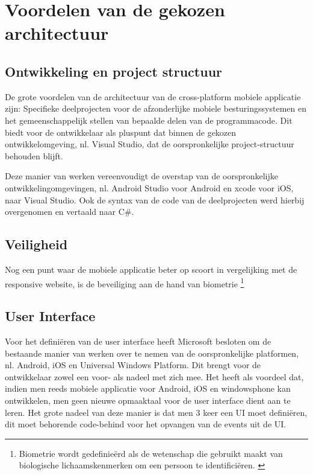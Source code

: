 \label{sec:voordelenvandegekozenapparchitectuur}
\section{Voordelen van de gekozen architectuur}
\subsection{Ontwikkeling en project structuur}
De grote voordelen van de architectuur van de cross-platform mobiele applicatie zijn: Specifieke deelprojecten voor de afzonderlijke
mobiele besturingssystemen en het gemeenschappelijk stellen van bepaalde delen van de programmacode. Dit biedt voor de ontwikkelaar
als pluspunt dat binnen de gekozen ontwikkelomgeving, nl. Visual Studio, dat de oorspronkelijke project-structuur behouden blijft.

Deze manier van werken vereenvoudigt de overstap van de oorspronkelijke ontwikkelingomgevingen, nl. Android Studio voor Android en xcode voor iOS, naar Visual Studio.
Ook de syntax van de code van de deelprojecten werd hierbij overgenomen en vertaald naar C\#.

\subsection{Veiligheid}
Nog een punt waar de mobiele applicatie beter op scoort in vergelijking met de responsive website, is de beveiliging aan de hand van biometrie \footnote{Biometrie wordt gedefinieërd als de wetenschap die gebruikt maakt van biologische lichaamskenmerken om een persoon te identificiëren. \citep{davidcheklingngoandrewbengjinteohjiankunhu2015}}


\subsection{User Interface}
Voor het definiëren van de user interface heeft Microsoft besloten om de bestaande manier van werken over te nemen van de oorspronkelijke platformen, nl. Android, iOS en Universal Windows Platform.
Dit brengt voor de ontwikkelaar zowel een voor- als nadeel met zich mee. Het heeft als voordeel dat, indien men reeds mobiele applicatie voor Android, iOS en windowsphone kan ontwikkelen, men geen
nieuwe opmaaktaal voor de user interface dient aan te leren. Het grote nadeel van deze manier is dat men 3 keer een UI moet definiëren,
dit moet behorende code-behind voor het opvangen van de events uit de UI.

